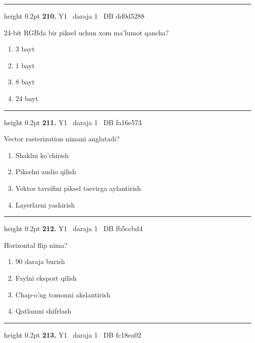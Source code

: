 \documentclass[10pt,a4paper,oneside]{article}
\begin{document}
\vspace{2mm}\hrule height 0.2pt \vspace{4mm}
\hypertarget{q210}{\textbf{\color{ink}210.}}  {\color{muted}\scriptsize Y1 \textbullet\ daraja 1 \textbullet\ DB dd0d5288}
\par
24-bit RGBda bir piksel uchun xom ma'lumot qancha?
\begin{enumerate}[label=\Alph*),leftmargin=9mm]
\item 3 bayt
\item 1 bayt
\item 8 bayt
\item 24 bayt
\end{enumerate}
\vspace{2mm}\hrule height 0.2pt \vspace{4mm}
\hypertarget{q211}{\textbf{\color{ink}211.}}  {\color{muted}\scriptsize Y1 \textbullet\ daraja 1 \textbullet\ DB fa16e573}
\par
Vector rasterization nimani anglatadi?
\begin{enumerate}[label=\Alph*),leftmargin=9mm]
\item Shaklni ko'chirish
\item Pikselni audio qilish
\item Vektor tavsifini piksel tasvirga aylantirish
\item Layerlarni yashirish
\end{enumerate}
\vspace{2mm}\hrule height 0.2pt \vspace{4mm}
\hypertarget{q212}{\textbf{\color{ink}212.}}  {\color{muted}\scriptsize Y1 \textbullet\ daraja 1 \textbullet\ DB fb5ccbd4}
\par
Horizontal flip nima?
\begin{enumerate}[label=\Alph*),leftmargin=9mm]
\item 90 daraja burish
\item Faylni eksport qilish
\item Chap-o'ng tomonni akslantirish
\item Qatlamni shifrlash
\end{enumerate}
\vspace{2mm}\hrule height 0.2pt \vspace{4mm}
\hypertarget{q213}{\textbf{\color{ink}213.}}  {\color{muted}\scriptsize Y1 \textbullet\ daraja 1 \textbullet\ DB fc18ea02}
\par
\end{document}
